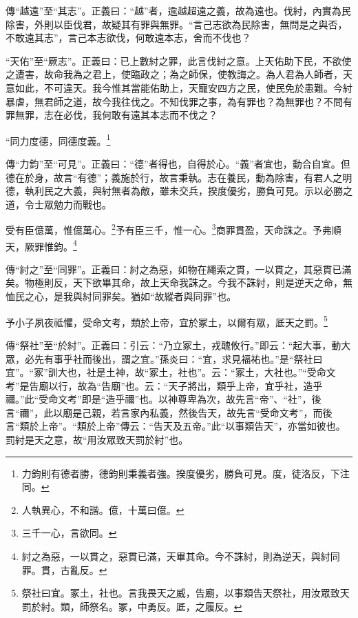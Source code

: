 {\noindent\zhuan{}\fzbyks 傳“越遠”至“其志”。正義曰：“越”者，逾越超遠之義，故為遠也。伐紂，內實為民除害，外則以臣伐君，故疑其有罪與無罪。“言己志欲為民除害，無問是之與否，不敢遠其志”，言己本志欲伐，何敢遠本志，舍而不伐也？ \par}

{\noindent\shu{}\fzkt “天佑”至“厥志”。正義曰：已上數紂之罪，此言伐紂之意。上天佑助下民，不欲使之遭害，故命我為之君上，使臨政之；為之師保，使教誨之。為人君為人師者，天意如此，不可違天。我今惟其當能佑助上，天寵安四方之民，使民免於患難。今紂暴虐，無君師之道，故今我往伐之。不知伐罪之事，為有罪也？為無罪也？不問有罪無罪，志在必伐，我何敢有遠其本志而不伐之？ \par}

“同力度德，同德度義。\footnote{力鈞則有德者勝，德鈞則秉義者強。揆度優劣，勝負可見。度，徒洛反，下注同。}

{\noindent\zhuan{}\fzbyks 傳“力鈞”至“可見”。正義曰：“德”者得也，自得於心。“義”者宜也，動合自宜。但德在於身，故言“有德”；義施於行，故言秉執。志在養民，動為除害，有君人之明德，執利民之大義，與紂無者為敵，雖未交兵，揆度優劣，勝負可見。示以必勝之道，令士眾勉力而戰也。 \par}

受有臣億萬，惟億萬心。\footnote{人執異心，不和諧。億，十萬曰億。}予有臣三千，惟一心。\footnote{三千一心，言欲同。}商罪貫盈，天命誅之。予弗順天，厥罪惟鈞。\footnote{紂之為惡，一以貫之，惡貫已滿，天畢其命。今不誅紂，則為逆天，與紂同罪。貫，古亂反。}

{\noindent\zhuan{}\fzbyks 傳“紂之”至“同罪”。正義曰：紂之為惡，如物在繩索之貫，一以貫之，其惡貫已滿矣。物極則反，天下欲畢其命，故上天命我誅之。今我不誅紂，則是逆天之命，無恤民之心，是我與紂同罪矣。猶如“故縱者與同罪”也。 \par}

予小子夙夜祗懼，受命文考，類於上帝，宜於冢土，以爾有眾，厎天之罰。\footnote{祭社曰宜。冢土，社也。言我畏天之威，告廟，以事類告天祭社，用汝眾致天罰於紂。類，師祭名。冢，中勇反。厎，之履反。}

{\noindent\zhuan{}\fzbyks 傳“祭社”至“於紂”。正義曰：引云：“乃立冢土，戎醜攸行。”即云：“起大事，動大眾，必先有事乎社而後出，謂之宜。”孫炎曰：“宜，求見福祐也。”是“祭社曰宜”。“冢”訓大也，社是土神，故“冢土，社也”。云：“冢土，大社也。”“受命文考”是告廟以行，故為“告廟”也。云：“天子將出，類乎上帝，宜乎社，造乎禰。”此“受命文考”即是“造乎禰”也。以神尊卑為次，故先言“帝”、“社”，後言“禰”，此以廟是己親，若言家內私義，然後告天，故先言“受命文考”，而後言“類於上帝”。“類於上帝”傳云：“告天及五帝。”此“以事類告天”，亦當如彼也。罰紂是天之意，故“用汝眾致天罰於紂”也。 \par}

